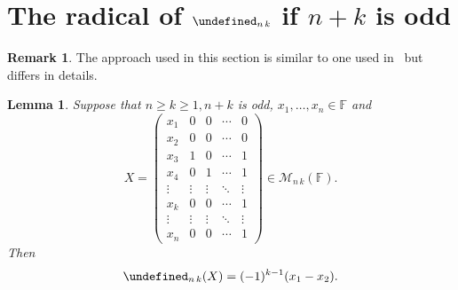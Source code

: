 \documentclass{elsarticle}
\def\F{{\mathbb F}}
\def\M{{\mathcal M}}
\let\det\undefined
\DeclareMathOperator{\det}{det}
\theoremstyle{plain}
\newtheorem{lemma}[theorem]{Lemma}
\theoremstyle{definition}
\newtheorem{remark}[theorem]{Remark}
\numberwithin{equation}{section}
\begin{document}
\section{The radical of $\det_{n\,k}$ if $n + k$ is odd}\label{sec:kernels}


\begin{remark}The approach used in this section is similar to one used in~\cite[Section~4]{Guterman2025} but differs in details.
\end{remark}

\begin{lemma}\label{lem:DetNKXiEqX1}Suppose that $n \ge k \ge 1, n+k$ is odd, $x_1, \ldots, x_n \in \F$ and
\[
X = \begin{pmatrix}
x_1 & 0 & 0 & \cdots & 0\\
x_2 & 0 & 0 & \cdots & 0\\
x_3 & 1 & 0 &\cdots & 1\\
x_4 & 0 & 1 &\cdots & 1\\
\vdots & \vdots & \vdots & \ddots & \vdots\\
x_k & 0 & 0 & \cdots & 1\\
\vdots & \vdots & \vdots & \ddots & \vdots\\
x_{n} & 0 & 0 & \cdots & 1
\end{pmatrix} \in \M_{n\,k}(\F).
\]
Then
\[
\det_{n\,k}(X) = (-1)^{k-1}(x_1 - x_2).
\]
\end{lemma}
\end{document}
